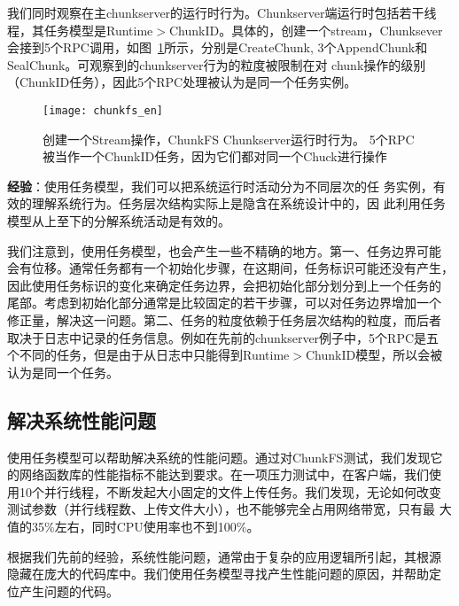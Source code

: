 我们同时观察在主chunkserver的运行时行为。Chunkserver端运行时包括若干线
程，其任务模型是Runtime$>$ChunkID。具体的，创建一个stream，Chunksever
会接到5个RPC调用，如图~\ref{fig:chunkserver}所示，分别是Create\-Chunk,
3个Append\-Chunk和Seal\-Chunk。可观察到的chunkserver行为的粒度被限制在对
chunk操作的级别（ChunkID任务），因此5个RPC处理被认为是同一个任务实例。

\begin{figure}[htbp]
  \centering
  \begin{minipage}{0.6\linewidth}
    \centering
    \texttt{[image: chunkfs\_en]}
    \caption{创建一个Stream操作，ChunkFS Chunkserver运行时行为。
    5个RPC被当作一个ChunkID任务，因为它们都对同一个Chuck进行操作}
    \label{fig:chunkserver}
  \end{minipage}
\end{figure}



\textbf{经验}：使用任务模型，我们可以把系统运行时活动分为不同层次的任
务实例，有效的理解系统行为。任务层次结构实际上是隐含在系统设计中的，因
此利用任务模型从上至下的分解系统活动是有效的。

我们注意到，使用任务模型，也会产生一些不精确的地方。第一、任务边界可能
会有位移。通常任务都有一个初始化步骤，在这期间，任务标识可能还没有产生，
因此使用任务标识的变化来确定任务边界，会把初始化部分划分到上一个任务的
尾部。考虑到初始化部分通常是比较固定的若干步骤，可以对任务边界增加一个
修正量，解决这一问题。第二、任务的粒度依赖于任务层次结构的粒度，而后者
取决于日志中记录的任务信息。例如在先前的chunkserver例子中，5个RPC是五
个不同的任务，但是由于从日志中只能得到Runtime$>$ChunkID模型，所以会被
认为是同一个任务。

\subsection{解决系统性能问题}

使用任务模型可以帮助解决系统的性能问题。通过对ChunkFS测试，我们发现它
的网络函数库的性能指标不能达到要求。在一项压力测试中，在客户端，我们使
用10个并行线程，不断发起大小固定的文件上传任务。我们发现，无论如何改变
测试参数（并行线程数、上传文件大小），也不能够完全占用网络带宽，只有最
大值的35\%左右，同时CPU使用率也不到100\%。

根据我们先前的经验，系统性能问题，通常由于复杂的应用逻辑所引起，其根源
隐藏在庞大的代码库中。我们使用任务模型寻找产生性能问题的原因，并帮助定
位产生问题的代码。

